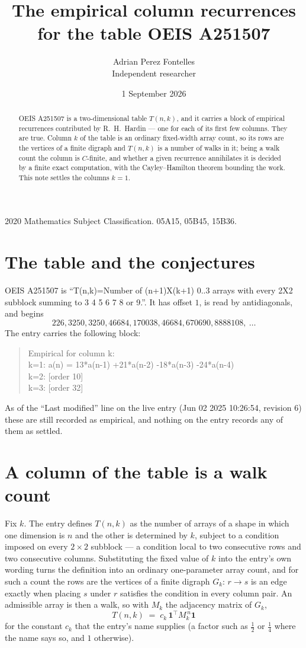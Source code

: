 \documentclass[11pt,a4paper]{article}
\title{The empirical column recurrences for the table OEIS A251507}
\author{Adrian Perez Fontelles\\ \small Independent researcher}
\date{1 September 2026}
\theoremstyle{plain}
\theoremstyle{definition}
\begin{document}
\maketitle

\begin{abstract}
OEIS A251507 is a two-dimensional table $T(n,k)$, and it carries a block of empirical
recurrences contributed by R.~H.~Hardin --- one for each of its first few columns. They are
true. Column $k$ of the table is an ordinary fixed-width array count, so its rows are the
vertices of a finite digraph and $T(n,k)$ is a number of walks in it; being a walk count the
column is $C$-finite, and whether a given recurrence annihilates it is decided by a finite
exact computation, with the Cayley--Hamilton theorem bounding the work. This note settles the columns $k=1$.
\end{abstract}

\noindent\small 2020 Mathematics Subject Classification. 05A15, 05B45, 15B36.\normalsize

\section{The table and the conjectures}

OEIS A251507 is ``T(n,k)=Number of (n+1)X(k+1) 0..3 arrays with every 2X2 subblock summing to 3 4 5 6 7 8 or 9.''. It has offset $1$, is
read by antidiagonals, and begins
\[
226, 3250, 3250, 46684, 170038, 46684, 670690, 8888108,\ \dots
\]
The entry carries the following block:
\begin{quote}\small
Empirical for column k:\\
k=1: a(n) = 13*a(n-1) +21*a(n-2) -18*a(n-3) -24*a(n-4)\\
k=2: [order 10]\\
k=3: [order 32]\\
\end{quote}
As of the ``Last modified'' line on the live entry (Jun 02 2025 10:26:54, revision 6) these are still
recorded as empirical, and nothing on the entry records any of them as settled.

\section{A column of the table is a walk count}

Fix $k$. The entry defines $T(n,k)$ as the number of arrays of a shape in which one dimension
is $n$ and the other is determined by $k$, subject to a condition imposed on every
$2\times2$ subblock --- a condition local to two consecutive rows and two consecutive columns.
Substituting the fixed value of $k$ into the entry's own wording turns the definition into an
ordinary one-parameter array count, and for such a count the rows are the vertices of a finite
digraph $G_k$: $r\to s$ is an edge exactly when placing $s$ under $r$ satisfies the condition
in every column pair. An admissible array is then a walk, so with $M_k$ the adjacency matrix
of $G_k$,
\[
T(n,k)\;=\;c_k\,\mathbf{1}^{\!\top}M_k^{\,n}\mathbf{1}
\]
for the constant $c_k$ that the entry's name supplies (a factor such as $\tfrac12$ or
$\tfrac14$ where the name says so, and $1$ otherwise).
\end{document}
